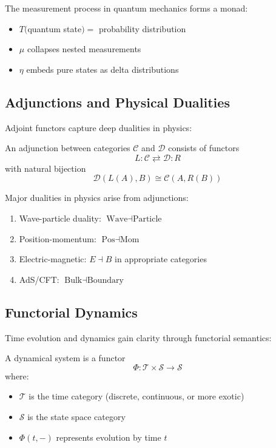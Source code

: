 \begin{example}
The measurement process in quantum mechanics forms a monad:
\begin{itemize}
\item $T($quantum state$) = $ probability distribution
\item $\mu$ collapses nested measurements
\item $\eta$ embeds pure states as delta distributions
\end{itemize}
\end{example}

\subsection{Adjunctions and Physical Dualities}

Adjoint functors capture deep dualities in physics:

\begin{definition}[Adjunction]
An adjunction between categories $\mathcal{C}$ and $\mathcal{D}$ consists of functors
\[
L: \mathcal{C} \rightleftarrows \mathcal{D} : R
\]
with natural bijection
\[
\mathcal{D}(L(A), B) \cong \mathcal{C}(A, R(B))
\]
\end{definition}

\begin{theorem}
Major dualities in physics arise from adjunctions:
\begin{enumerate}
\item Wave-particle duality: $\text{Wave} \dashv \text{Particle}$
\item Position-momentum: $\text{Pos} \dashv \text{Mom}$
\item Electric-magnetic: $E \dashv B$ in appropriate categories
\item AdS/CFT: $\text{Bulk} \dashv \text{Boundary}$
\end{enumerate}
\end{theorem}

\subsection{Functorial Dynamics}

Time evolution and dynamics gain clarity through functorial semantics:

\begin{definition}
A dynamical system is a functor
\[
\Phi: \mathcal{T} \times \mathcal{S} \to \mathcal{S}
\]
where:
\begin{itemize}
\item $\mathcal{T}$ is the time category (discrete, continuous, or more exotic)
\item $\mathcal{S}$ is the state space category
\item $\Phi(t, -)$ represents evolution by time $t$
\end{itemize}
\end{definition}

